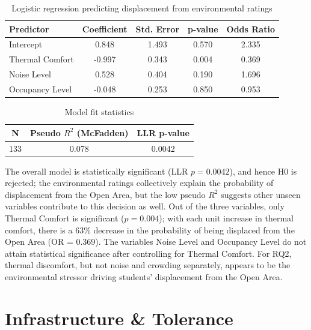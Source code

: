\documentclass[12pt, a4paper]{report}
\begin{document}
\begin{table}[H]
    \centering
    \caption{Logistic regression predicting displacement from environmental ratings}
    \label{tab:logit}
    \begin{tabular}{|l|c|c|c|c|}
        \hline
        \textbf{Predictor} & \textbf{Coefficient} & \textbf{Std. Error} & \textbf{p-value} & \textbf{Odds Ratio} \\ \hline
        Intercept        & 0.848  & 1.493 & 0.570 & 2.335 \\ \hline
        Thermal Comfort  & -0.997 & 0.343 & 0.004 & 0.369 \\ \hline
        Noise Level      & 0.528  & 0.404 & 0.190 & 1.696 \\ \hline
        Occupancy Level  & -0.048 & 0.253 & 0.850 & 0.953 \\ \hline
    \end{tabular}
\end{table}

\begin{table}[H]
    \centering
    \caption{Model fit statistics}
    \label{tab:logitfit}
    \begin{tabular}{|c|c|c|}
        \hline
        \textbf{N} & \textbf{Pseudo $R^2$ (McFadden)} & \textbf{LLR p-value} \\ \hline
        133 & 0.078 & 0.0042 \\ \hline
    \end{tabular}
\end{table}

The overall model is statistically significant (LLR $p = 0.0042$), and hence H0 is rejected; the environmental ratings collectively explain the probability of displacement from the Open Area, but the low pseudo $R^2$ suggests other unseen variables contribute to this decision as well. Out of the three variables, only Thermal Comfort is significant ($p = 0.004$); with each unit increase in thermal comfort, there is a 63\% decrease in the probability of being displaced from the Open Area (OR = 0.369). The variables Noise Level and Occupancy Level do not attain statistical significance after controlling for Thermal Comfort. For RQ2, thermal discomfort, but not noise and crowding separately, appears to be the environmental stressor driving students' displacement from the Open Area.

\chapter{Infrastructure \& Tolerance}
\end{document}
